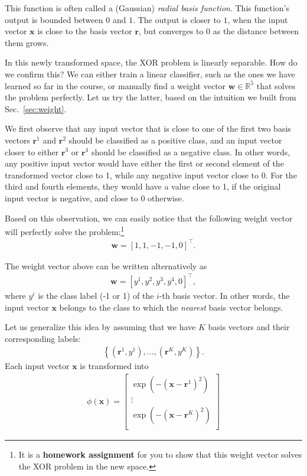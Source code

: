 \documentclass{report}
\newcommand{\vect}[1]{\mathbf{#1}}
\newcommand{\vx}[0]{\vect{x}}
\newcommand{\vw}[0]{\vect{w}}
\newcommand{\vr}[0]{\vect{r}}
\newcommand{\RR}[0]{\mathbb{R}}
\begin{document}
This function is often called a (Gaussian) {\it radial basis function}. This
function's output is bounded between $0$ and $1$. The output is closer to $1$,
when the input vector $\vx$ is close to the basis vector $\vr$, but converges to
$0$ as the distance between them grows. 

In this newly transformed space, the XOR problem is linearly separable. How do
we confirm this? We can either train a linear classifier, such as the ones we
have learned so far in the course, or manually find a weight vector $\vw \in
\RR^5$ that solves the problem perfectly. Let us try the latter, based on the
intuition we built from Sec.~\ref{sec:weight}.

We first observe that any input vector that is close to one of the first two
basis vectors $\vr^1$ and $\vr^2$ should be classified as a positive class, and
an input vector closer to either $\vr^3$ or $\vr^4$ should be classified as a
negative class. In other words, any positive input vector would have either the
first or second element of the transformed vector close to 1, while any negative
input vector close to 0. For the third and fourth elements, they would have a
value close to 1, if the original input vector is negative, and close to 0
otherwise. 

Based on this observation, we can easily notice that the following weight vector
will perfectly solve the problem:\footnote{
    It is a {\bf homework assignment} for you to show that this weight vector
    solves the XOR problem in the new space. 
}
\begin{align*}
    \vw = \left[ 1, 1, -1, -1, 0 \right]^\top.
\end{align*}

The weight vector above can be written alternatively as 
\begin{align}
    \label{eq:w_rbf}
    \vw = \left[ y^1, y^2, y^3, y^4, 0\right]^\top,
\end{align}
where $y^i$ is the class label (-1 or 1) of the $i$-th basis vector.
In other words, the input vector $\vx$ belongs to the class to which the {\it
nearest} basis vector belongs. 

Let us generalize this idea by assuming that we have $K$ basis vectors and their
corresponding labels:
\begin{align*}
    \left\{ (\vr^1, y^1), \ldots, (\vr^K, y^K) \right\}.
\end{align*}
Each input vector $\vx$ is transformed into
\begin{align}
    \label{eq:W_rbf}
    \phi(\vx) = \left[ 
        \begin{array}{c}
            \exp\left( -(\vx - \vr^1)^2 \right)  \\
            \vdots \\
            \exp\left( -(\vx - \vr^K)^2 \right)  \\
        \end{array}
    \right]
\end{align}
\end{document}
